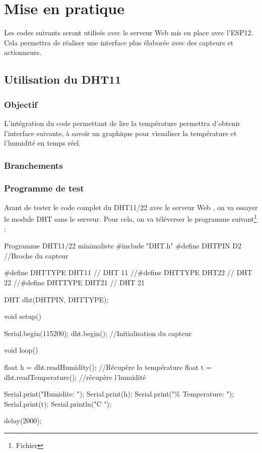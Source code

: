 \chapter{Mise en pratique}

Les codes suivants seront utilisés avec le serveur Web mis en place avec l'ESP12.\\
Cela permettra de réaliser une interface plus élaborée avec des capteurs et actionneurs.

\section{Utilisation du DHT11}


\subsection{Objectif}
L'intégration du code permettant de lire la température permettra d'obtenir l'interface suivante, à savoir un graphique pour 
visualiser la température et l'humidité en temps réel.


\subsection{Branchements}


\subsection{Programme de test}

Avant de tester le code complet du DHT11/22 avec le serveur Web , on va essayer le module DHT sans le serveur. 
Pour cela, on va téléverser le programme suivant\footnote{Fichier } :

\begin{Cpp}{Programme DHT11/22 minimaliste}
    #include "DHT.h"
    #define DHTPIN D2     //Broche du capteur
    
    #define DHTTYPE DHT11   // DHT 11
    //#define DHTTYPE DHT22   // DHT 22 
    //#define DHTTYPE DHT21   // DHT 21 
    
    DHT dht(DHTPIN, DHTTYPE);
    
    void setup() {
      
      Serial.begin(115200);
      dht.begin();          //Initialisation du capteur
    }
    
    void loop() {
    
      float h = dht.readHumidity();       //Récupère la température
      float t = dht.readTemperature();    //récupère l'humidité
    
      Serial.print("Humidite: ");
      Serial.print(h);
      Serial.print("\%  Temperature: ");
      Serial.print(t);
      Serial.println("C ");
      
      delay(2000);
    
    }
\end{Cpp}

